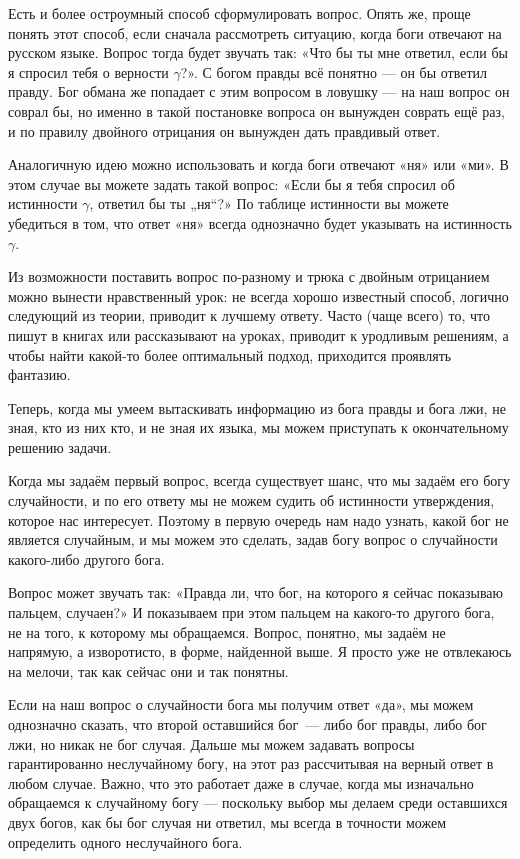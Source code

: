 Есть и более остроумный способ сформулировать вопрос. Опять же, проще понять этот способ, если сначала рассмотреть ситуацию, когда боги отвечают на русском языке. Вопрос тогда будет звучать так: «Что бы ты мне ответил, если бы я спросил тебя о верности $\gamma$?». С богом правды всё понятно — он бы ответил правду. Бог обмана же попадает с этим вопросом в ловушку — на наш вопрос он соврал бы, но именно в такой постановке вопроса он вынужден соврать ещё раз, и по правилу двойного отрицания он вынужден дать правдивый ответ.

Аналогичную идею можно использовать и когда боги отвечают «ня» или «ми». В этом случае вы можете задать такой вопрос: «Если бы я тебя спросил об истинности $\gamma$, ответил бы ты „ня“?» По таблице истинности вы можете убедиться в том, что ответ «ня» всегда однозначно будет указывать на истинность $\gamma$.

Из возможности поставить вопрос по-разному и трюка с двойным отрицанием можно вынести нравственный урок: не всегда хорошо известный способ, логично следующий из теории, приводит к лучшему ответу. Часто (чаще всего) то, что пишут в книгах или рассказывают на уроках, приводит к уродливым решениям, а чтобы найти какой-то более оптимальный подход, приходится проявлять фантазию.

Теперь, когда мы умеем вытаскивать информацию из бога правды и бога лжи, не зная, кто из них кто, и не зная их языка, мы можем приступать к окончательному решению задачи.

Когда мы задаём первый вопрос, всегда существует шанс, что мы задаём его богу случайности, и по его ответу мы не можем судить об истинности утверждения, которое нас интересует. Поэ\-то\-му в первую очередь нам надо узнать, какой бог не является случайным, и мы можем это сделать, задав богу вопрос о случайности какого-либо другого бога.

Вопрос может звучать так: «Правда ли, что бог, на которого я сейчас показываю пальцем, случаен?» И показываем при этом пальцем на какого-то другого бога, не на того, к которому мы обращаемся. Вопрос, понятно, мы задаём не напрямую, а изворотисто, в форме, найденной выше. Я просто уже не отвлекаюсь на мелочи, так как сейчас они и так понятны.

Если на наш вопрос о случайности бога мы получим ответ «да», мы можем однозначно сказать, что второй оставшийся бог~— либо бог правды, либо бог лжи, но никак не бог случая. Дальше мы можем задавать вопросы гарантированно неслучайному богу, на этот раз рассчитывая на верный ответ в любом случае. Важно, что это работает даже в случае, когда мы изначально обращаемся к случайному богу — поскольку выбор мы делаем среди оставшихся двух богов, как бы бог случая ни ответил, мы всегда в точности можем определить одного неслучайного бога.


